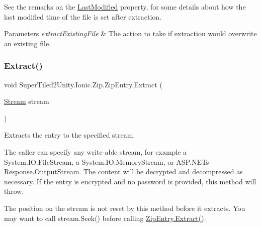 See the remarks on the \mbox{\hyperlink{class_super_tiled2_unity_1_1_ionic_1_1_zip_1_1_zip_entry_acd1234fd27c216b59c166c2b96aba3dd}{Last\+Modified}} property, for some details about how the last modified time of the file is set after extraction. 


\begin{DoxyParams}{Parameters}
{\em extract\+Existing\+File} & The action to take if extraction would overwrite an existing file. \\
\hline
\end{DoxyParams}
\mbox{\label{class_super_tiled2_unity_1_1_ionic_1_1_zip_1_1_zip_entry_a13e055aec36ff9eb116526778dd413fe}} 
\subsubsection{\texorpdfstring{Extract()}{Extract()}\hspace{0.1cm}{\footnotesize\ttfamily [3/5]}}
{\footnotesize\ttfamily void Super\+Tiled2\+Unity.\+Ionic.\+Zip.\+Zip\+Entry.\+Extract (\begin{DoxyParamCaption}\item[{\mbox{\hyperlink{namespace_super_tiled2_unity_1_1_ionic_1_1_zip_a9ced5352c56e7e0fceff15b534073c83aeae835e83c0494a376229f254f7d3392}{Stream}}}]{stream }\end{DoxyParamCaption})}



Extracts the entry to the specified stream. 

The caller can specify any write-\/able stream, for example a System.\+I\+O.\+File\+Stream, a System.\+I\+O.\+Memory\+Stream, or A\+S\+P.\+N\+ET\textquotesingle{}s {\ttfamily Response.\+Output\+Stream}. The content will be decrypted and decompressed as necessary. If the entry is encrypted and no password is provided, this method will throw. 

The position on the stream is not reset by this method before it extracts. You may want to call stream.\+Seek() before calling \mbox{\hyperlink{class_super_tiled2_unity_1_1_ionic_1_1_zip_1_1_zip_entry_a9d65543aadd23e47e188175412891b42}{Zip\+Entry.\+Extract()}}. 


